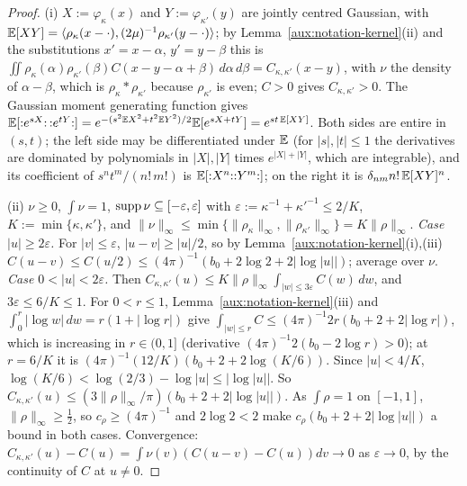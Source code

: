 \begin{proof}
(i) $X:=\varphi_\kappa(x)$ and $Y:=\varphi_{\kappa'}(y)$ are jointly centred Gaussian, with
$\mathbb{E}[XY]=\langle \rho_\kappa(x-\cdot),(2\mu)^{-1}\rho_{\kappa'}(y-\cdot)\rangle$; by
Lemma~\ref{aux:notation-kernel}(ii) and the substitutions $x'=x-\alpha$, $y'=y-\beta$ this is
$\iint\rho_\kappa(\alpha)\rho_{\kappa'}(\beta)C(x-y-\alpha+\beta)\,d\alpha\,d\beta=
C_{\kappa,\kappa'}(x-y)$, with $\nu$ the density of $\alpha-\beta$, which is
$\rho_\kappa*\rho_{\kappa'}$ because $\rho_{\kappa'}$ is even; $C>0$ gives
$C_{\kappa,\kappa'}>0$.  The Gaussian moment generating function gives
$\mathbb{E}[{:}e^{sX}{:}\,{:}e^{tY}{:}]=e^{-(s^2\mathbb{E} X^2+t^2\mathbb{E} Y^2)/2}\mathbb{E}[e^{sX+tY}]=e^{st\,\mathbb{E}[XY]}$.  Both
sides are entire in $(s,t)$; the left side may be differentiated under $\mathbb{E}$ (for $|s|,|t|\le1$
the derivatives are dominated by polynomials in $|X|,|Y|$ times $e^{|X|+|Y|}$, which are
integrable), and its coefficient of $s^nt^m/(n!\,m!)$ is $\mathbb{E}[{:}X^n{:}{:}Y^m{:}]$; on the right
it is $\delta_{nm}n!\,\mathbb{E}[XY]^n$.

(ii) $\nu\ge0$, $\int\nu=1$, $\operatorname{supp}\nu\subseteq[-\varepsilon,\varepsilon]$ with
$\varepsilon:=\kappa^{-1}+\kappa'^{-1}\le2/K$, $K:=\min\{\kappa,\kappa'\}$, and
$\|\nu\|_\infty\le\min\{\|\rho_\kappa\|_\infty,\|\rho_{\kappa'}\|_\infty\}=K\|\rho\|_\infty$.
\emph{Case $|u|\ge2\varepsilon$.}  For $|v|\le\varepsilon$, $|u-v|\ge|u|/2$, so by
Lemma~\ref{aux:notation-kernel}(i),(iii) $C(u-v)\le C(u/2)\le(4\pi)^{-1}(b_0+2\log2+
2|\log|u||)$; average over $\nu$.  \emph{Case $0<|u|<2\varepsilon$.}  Then
$C_{\kappa,\kappa'}(u)\le K\|\rho\|_\infty\int_{|w|\le3\varepsilon}C(w)\,dw$, and
$3\varepsilon\le6/K\le1$.  For $0<r\le1$, Lemma~\ref{aux:notation-kernel}(iii) and
$\int_0^r|\log w|\,dw=r(1+|\log r|)$ give $\int_{|w|\le r}C\le(4\pi)^{-1}2r(b_0+2+2|\log
r|)$, which is increasing in $r\in(0,1]$ (derivative $(4\pi)^{-1}2(b_0-2\log r)>0$); at
$r=6/K$ it is $(4\pi)^{-1}(12/K)(b_0+2+2\log(K/6))$.  Since $|u|<4/K$,
$\log(K/6)<\log(2/3)-\log|u|\le|\log|u||$.  So $C_{\kappa,\kappa'}(u)\le(3\|\rho\|_\infty/\pi)
(b_0+2+2|\log|u||)$.  As $\int\rho=1$ on $[-1,1]$, $\|\rho\|_\infty\ge\frac12$, so
$c_\rho\ge(4\pi)^{-1}$ and $2\log2<2$ make $c_\rho(b_0+2+2|\log|u||)$ a bound in both cases.
Convergence: $C_{\kappa,\kappa'}(u)-C(u)=\int\nu(v)(C(u-v)-C(u))dv\to0$ as $\varepsilon\to0$, by
the continuity of $C$ at $u\ne0$.


\end{proof}
